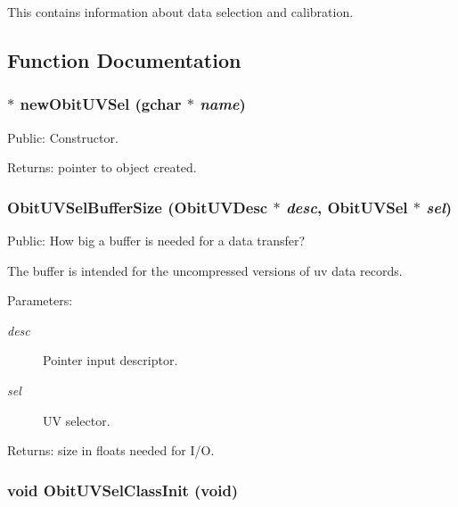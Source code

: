 This contains information about data selection and calibration.

\subsection{Function Documentation}
\subsubsection{$\ast$ new\-Obit\-UVSel (gchar $\ast$ {\em name})}\label{ObitUVSel_8c_a7}


Public: Constructor. 

\begin{Desc}
\item[Returns:]pointer to object created. \end{Desc}
\subsubsection{ Obit\-UVSel\-Buffer\-Size ({\bf Obit\-UVDesc} $\ast$ {\em desc}, {\bf Obit\-UVSel} $\ast$ {\em sel})}\label{ObitUVSel_8c_a10}


Public: How big a buffer is needed for a data transfer? 

The buffer is intended for the uncompressed versions of uv data records. \begin{Desc}
\item[Parameters:]
\begin{description}
\item[{\em desc}]Pointer input descriptor. \item[{\em sel}]UV selector. \end{description}
\end{Desc}
\begin{Desc}
\item[Returns:]size in floats needed for I/O. \end{Desc}
\subsubsection{\setlength{\rightskip}{0pt plus 5cm}void Obit\-UVSel\-Class\-Init (void)}\label{ObitUVSel_8c_a22}


